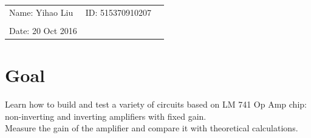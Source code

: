 \documentclass{article}
\begin{document}
\vspace*{0.25cm}

\hrulefill

\thispagestyle{empty}

\begin{center}
\begin{large}
\end{large}

\hrulefill

\vspace*{5cm}
\begin{Large}
\end{Large}

\vspace{2em}

\begin{large}
\end{large}
\end{center}


\vfill

\begin{table}[h!]
\flushleft
\begin{tabular}{lll}
Name: Yihao Liu \hspace*{2em}&
ID: 515370910207\hspace*{2em}\\


\\

Date: 20 Oct 2016 

\end{tabular}
\end{table}

\hfill
\begin{tiny}
[rev. 1.0]
\end{tiny}
\newpage


\section{Goal}
Learn how to build and test a variety of circuits based on LM 741 Op Amp chip: non-inverting and inverting amplifiers with fixed gain.\\

Measure the gain of the amplifier and compare it with theoretical calculations.\\
\end{document}
